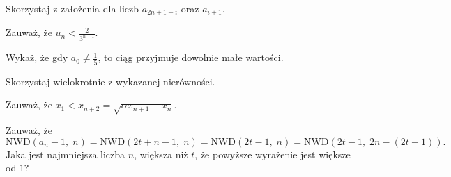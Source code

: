 
\begin{hints_list}
	\item *
	\item Skorzystaj z założenia dla liczb $a_{2n + 1 - i}$ oraz $a_{i + 1}$.
	\item Zauważ, że $u_n <  \frac{2}{3^{n + 1}}$.
	\item Wykaż, że gdy $a_0 \neq \frac{1}{5}$, to ciąg przyjmuje dowolnie małe wartości.
	\item Skorzystaj wielokrotnie z wykazanej nierówności.
	\item Zauważ, że $x_1 < x_{n + 2} = \sqrt{\alpha x_{n+1} - x_n}$.
	\item Zauważ, że
	\[
		\mathrm{NWD}(a_n − 1,\; n) = \mathrm{NWD}(2t + n - 1,\; n) = \mathrm{NWD}(2t - 1,\; n) = \mathrm{NWD}(2t - 1,\; 2n - (2t - 1)).
	\]
	Jaka jest najmniejsza liczba $n$, większa niż $t$, że powyższe wyrażenie jest większe od $1$?
\end{hints_list}